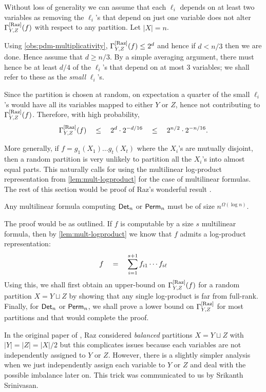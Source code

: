 \begin{proof-sketch}
Without loss of generality we can assume that each $\ell_i$ depends on at least two variables as removing the $\ell_i$'s that depend on just one variable does not alter $\Gamma^{\mathrm{[Raz]}}_{Y,Z}(f)$ with respect to any partition. 
Let $|X| = n$. 

Using \autoref{obs:pdm-multiplicativity}, $\Gamma^{\mathrm{[Raz]}}_{Y,Z}(f) \leq 2^d$ and hence if $d < n/3$ then we are done. 
Hence assume that $d \geq n/3$. 
By a simple averaging argument, there must hence be at least $d/4$ of the $\ell_i$'s that depend on at most $3$ variables; we shall refer to these as the \emph{small} $\ell_i$'s. 

Since the partition is chosen at random, on expectation a quarter of the small $\ell_i$'s would have all its variables mapped to either $Y$ or $Z$, hence not contributing to $\Gamma^{\mathrm{[Raz]}}_{Y,Z}(f)$. 
Therefore, with high probability,
$$
\Gamma^{\mathrm{[Raz]}}_{Y,Z}(f) \quad \leq \quad 2^{d} \cdot 2^{-d/16} \quad \leq \quad 2^{n/2} \cdot 2^{-n/16}.
$$
\end{proof-sketch}

More generally, if $f = g_1(X_1)\dots g_t(X_t)$ where the $X_i$'s are mutually disjoint, then a random partition is very unlikely to partition all the $X_i$'s into almost equal parts. 
This naturally calls for using the multilinear log-product representation from \autoref{lem:mult-logproduct} for the case of multilinear formulas. The rest of this section would be proof of Raz's wonderful result \cite{raz2004}. 

\begin{theorem} \label{thm:raz-ml-det}
Any multilinear formula computing $\operatorname{\mathsf{Det}}_n$ or $\operatorname{\mathsf{Perm}}_n$ must be of size $n^{\Omega(\log n)}$. 
\end{theorem}

The proof would be as outlined. If $f$ is computable by a size $s$ multilinear formula, then by \autoref{lem:mult-logproduct} we know that $f$ admits a log-product representation:
\[
f \quad = \quad \sum_{i=1}^{s+1} f_{i1} \cdots f_{i\ell}
\]
Using this, we shall first obtain an upper-bound on $\Gamma^{\mathrm{[Raz]}}_{Y,Z}(f)$ for a random partition $X = Y \sqcup Z$ by showing that any single log-product is far from full-rank. Finally, for $\operatorname{\mathsf{Det}}_n$ or $\operatorname{\mathsf{Perm}}_n$, we shall prove a lower bound on $\Gamma^{\mathrm{[Raz]}}_{Y,Z}$ for most partitions and that would complete the proof. 

In the original paper of \cite{raz2004}, Raz considered \emph{balanced} partitions $X = Y \sqcup Z$ with $|Y| = |Z| = |X|/2$ but this complicates issues because each variables are not independently assigned to $Y$ or $Z$. However, there is a slightly simpler analysis when we just independently assign each variable to $Y$ or $Z$ and deal with the possible imbalance later on. This trick was communicated to us by Srikanth Srinivasan. 


